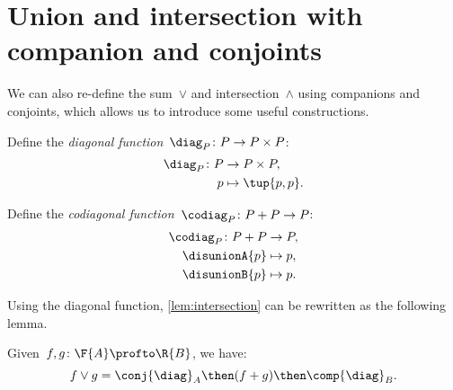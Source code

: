 

\section{Union and intersection with companion and conjoints}


We can also re-define the sum~$\vee$ and intersection~$\wedge$ using companions and conjoints, which allows us to introduce some useful constructions.

\begin{definition}
    \label{def:diagonal-function}
    Define the \emph{diagonal function}~$\diag_P\colon P \to P \times P$:
    \begin{equation}
        \begin{aligned}
            \diag_P \colon P & \to P \times P, \\
            p & \mapsto \tup{p, p}.
        \end{aligned}
    \end{equation}
\end{definition}

\begin{definition}
    \label{def:codiagonal-function}
    Define the \emph{codiagonal function}~$\codiag_P\colon P+P \to P $:
    \begin{equation}
        \begin{aligned}
            \codiag_P \colon P + P & \to P,  \\
            \disunionA{p} & \mapsto p, \\
            \disunionB{p} & \mapsto p.
        \end{aligned}
    \end{equation}
\end{definition}


Using the diagonal function, \cref{lem:intersection} can be rewritten as the following lemma.

\begin{lemma}
    Given~$f, g\colon \F{A} \profto \R{B}$, we have:
    \begin{equation}
        f \vee g =  \conj{\diag}_A \then (f + g)\then \comp{\diag}_B.
    \end{equation}
\end{lemma}

